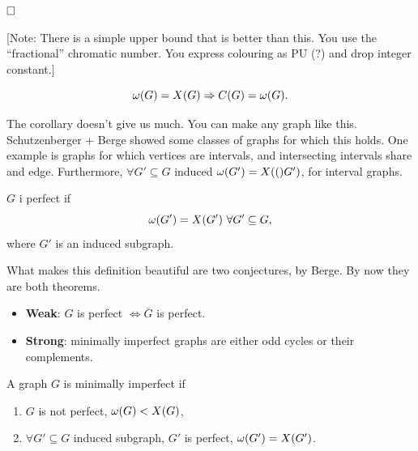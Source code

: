 $\hfill\Box$

[Note: There is a simple upper bound that is better than this. You use the ``fractional'' chromatic number. You express colouring as PU (?) and drop integer constant.]

\begin{cor}
 $$\omega(G) = X(G) \Rightarrow C(G) = \omega(G).$$
\end{cor}

The corollary doesn't give us much. You can make any graph like this. Schutzenberger + Berge showed some classes of graphs for which this holds. One example is graphs for which vertices are intervals, and intersecting intervals share and edge. Furthermore, $\forall G' \subseteq G$ induced $\omega(G') = X(()G')$, for interval graphs.

\begin{definition}
 $G$ i perfect if $$\omega(G') = \chrom{G'}\ \forall G' \subseteq G,$$ where $G'$ is an induced subgraph.
\end{definition}

What makes this definition beautiful are two conjectures, by Berge. By now they are both theorems.
\begin{itemize}
 \item \textbf{Weak}: $G$ is perfect $\Leftrightarrow \overline{G}$ is perfect.
 \item \textbf{Strong}: minimally imperfect graphs are either odd cycles or their complements.
\end{itemize}

\begin{definition}
 A graph $G$ is minimally imperfect if
 \begin{enumerate}
  \item $G$ is not perfect, \ie $\omega(G) < X(G)$,
  \item $\forall G' \subseteq G$ induced subgraph, $G'$ is perfect, \ie $\omega(G') = X(G')$.
 \end{enumerate}

\end{definition}




